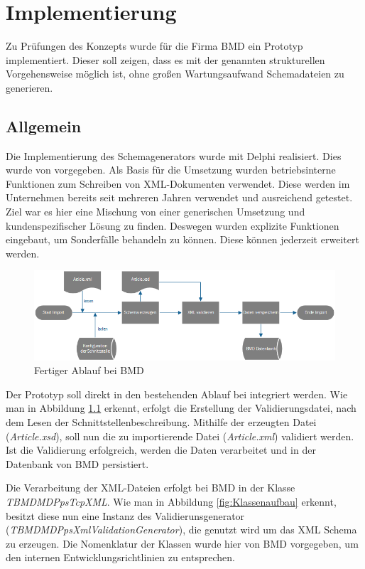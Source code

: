 \chapter{Implementierung}
\label{cha:Implementierung}
Zu Prüfungen des Konzepts wurde für die Firma BMD ein Prototyp implementiert. 
Dieser soll zeigen, dass es mit der genannten strukturellen Vorgehensweise möglich ist, ohne großen Wartungsaufwand Schemadateien zu generieren.


\section{Allgemein}
Die Implementierung des Schemagenerators wurde mit Delphi realisiert. Dies wurde von \BMD vorgegeben.
Als Basis für die Umsetzung wurden betriebsinterne Funktionen zum Schreiben von XML-Dokumenten verwendet. 
Diese werden im Unternehmen bereits seit mehreren Jahren verwendet und ausreichend getestet.
Ziel war es hier eine Mischung von einer generischen Umsetzung und kundenspezifischer Lösung zu finden. 
Deswegen wurden explizite Funktionen eingebaut, um Sonderfälle behandeln zu können. Diese können jederzeit erweitert werden.


\begin{figure}
    \centering
    \includegraphics[width=.95\textwidth]{images/Ablaufdiagramm.png}
    \caption{Fertiger Ablauf bei BMD}
    \label{fig:Ablauf}
\end{figure}

Der Prototyp soll direkt in den bestehenden Ablauf bei \BMD integriert werden. Wie man in Abbildung \ref{fig:Ablauf} erkennt, erfolgt die Erstellung der Validierungsdatei, nach dem Lesen der Schnittstellenbeschreibung. Mithilfe der erzeugten Datei (\emph{Article.xsd}), soll nun die zu importierende Datei (\emph{Article.xml}) validiert werden. Ist die Validierung erfolgreich, werden die Daten verarbeitet und in der Datenbank von BMD persistiert.

Die Verarbeitung der XML-Dateien erfolgt bei BMD in der Klasse \emph{TBMDMDPpsTcpXML}. Wie man in Abbildung \ref{fig:Klassenaufbau} erkennt, besitzt diese nun eine Instanz des Validierunsgenerator (\emph{TBMDMDPpsXmlValidationGenerator}), die genutzt wird um das XML Schema zu erzeugen. Die Nomenklatur der Klassen wurde hier von BMD vorgegeben, um den internen Entwicklungsrichtlinien zu entsprechen.

